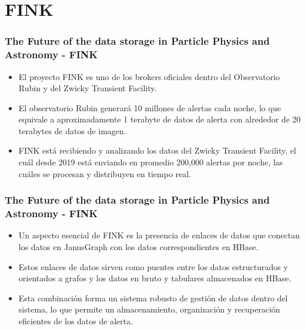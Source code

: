 \section{FINK}

\begin{frame}
    \frametitle{The Future of the data storage in Particle Physics and Astronomy - FINK}

    \begin{itemize}
        \item El proyecto FINK es uno de los brokers oficiales dentro del Observatorio Rubin y del Zwicky Transient Facility.

         

        \item El observatorio Rubin generará 10 millones de alertas cada noche, lo que equivale a aproximadamente 1 terabyte de datos de alerta con alrededor de 20 terabytes de datos de imagen.

         

        \item FINK está recibiendo y analizando los datos del Zwicky Transient Facility, el cuál desde 2019 está enviando en promedio 200,000 alertas por noche, las cuáles se procesan y distribuyen en tiempo real.
    \end{itemize}
    
\end{frame}

\begin{frame}
    \frametitle{The Future of the data storage in Particle Physics and Astronomy - FINK}

    \begin{itemize}
        \item Un aspecto esencial de FINK es la presencia de enlaces de datos que conectan los datos en JanusGraph con los datos correspondientes en HBase. 

         
        
        \item Estos enlaces de datos sirven como puentes entre los datos estructurados y orientados a grafos y los datos en bruto y tabulares almacenados en HBase.

         
        
        \item Esta combinación forma un sistema robusto de gestión de datos dentro del sistema, lo que permite un almacenamiento, organización y recuperación eficientes de los datos de alerta.
    \end{itemize}

\end{frame}

